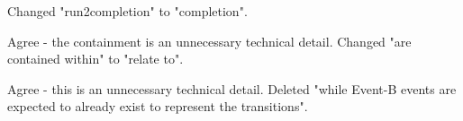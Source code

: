 \documentclass{response}
\begin{document}
\begin{comment}{Reviewer \#3}
  Page 2:
  
  * Second paragraph appears complicated writing.
\end{comment}

\begin{response}
\end{response}

\begin{comment}{Reviewer \#3}
  Page 3:

* Listing 1: I think I would name that variable "run2completion" differently.
\end{comment}

\begin{response}
	Changed "run2completion" to "completion".
\end{response}


\begin{comment}{Reviewer \#3}
  Page 4:

  * Mid, it is not clear what this means:

  "The diagrammatic models are contained within an Event-B machine"
\end{comment}

\begin{response}
	Agree - the containment is an unnecessary technical detail. Changed "are contained within" to "relate to".
\end{response}

\begin{comment}{Reviewer \#3}
Page 4:
  and this as well:

 "while Event-B events are expected to already exist to represent the transitions."
\end{comment}

\begin{response}
	Agree - this is an unnecessary technical detail. Deleted  "while Event-B events are expected to already exist to represent the transitions".
\end{response}

\begin{comment}{Reviewer \#3}
  Page 5:

  * It would seem more natural to have one state variable ranging over
  an enumerated type of states, rather than having a Boolean flag for
  each state.
\end{comment}
  
\end{document}
